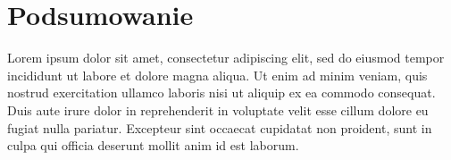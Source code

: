 \documentclass[final,a4paper,openany,12pt]{mwbk}
\begin{document}
\newpage
\chapter{Podsumowanie}

Lorem ipsum dolor sit amet, consectetur adipiscing elit, sed do eiusmod tempor incididunt ut labore et dolore magna aliqua. Ut enim ad minim veniam, quis nostrud exercitation ullamco laboris nisi ut aliquip ex ea commodo consequat. Duis aute irure dolor in reprehenderit in voluptate velit esse cillum dolore eu fugiat nulla pariatur. Excepteur sint occaecat cupidatat non proident, sunt in culpa qui officia deserunt mollit anim id est laborum.



\end{document}
